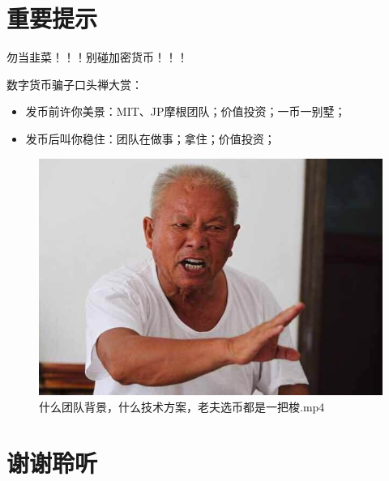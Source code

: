 \documentclass[11pt]{beamer}
\begin{document}
\section{重要提示}
\begin{frame}{勿当韭菜！！！别碰加密货币！！！}

	{\color{red}
		数字货币骗子口头禅大赏：
		\begin{itemize}
			\item 发币前许你美景：MIT、JP摩根团队；价值投资；一币一别墅；
			\item 发币后叫你稳住：团队在做事；拿住；价值投资；
		\end{itemize}
	}
	\begin{figure}
		\centering
		\includegraphics[width=0.5\linewidth]{figures/AllInGrandpa}
		\caption{什么团队背景，什么技术方案，老夫选币都是一把梭.mp4}
		\label{fig:allingrandpa}
	\end{figure}

\end{frame}

\section*{谢谢聆听}
\end{document}
